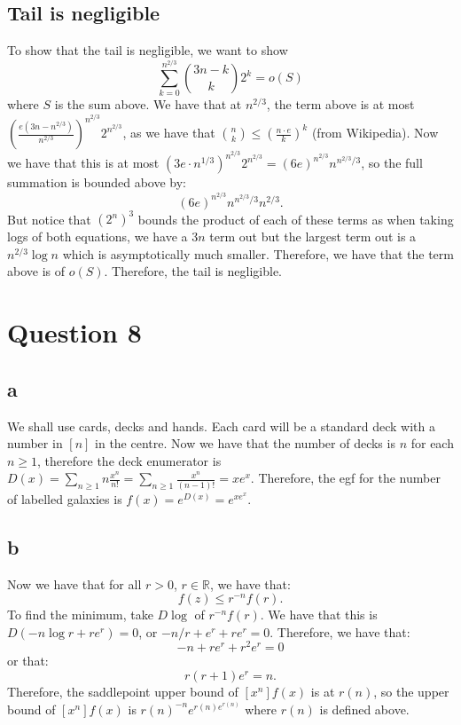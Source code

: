 \documentclass[]{article}
\theoremstyle{definition}
\numberwithin{theorem}{section}
\numberwithin{equation}{section}
\begin{document}
\subsection{Tail is negligible}
To show that the tail is negligible, we want to show
\begin{equation}
	\sum_{k = 0}^{n^{2/3}}\binom{3n - k}{k} 2^k = o(S)
\end{equation}
where $S$ is the sum above. 
We have that at $n^{2/3}$, the term above is at most $\left(\frac{e(3n - n^{2/3})}{n^{2/3}}\right)^{n^{2/3}} 2^{n^{2/3}}$, as we have that $\binom{n}{k} \leq \left(\frac{n \cdot e}{k}\right)^k$ (from Wikipedia). Now we have that this is at most $(3e \cdot n^{1/3})^{n^{2/3}} 2^{n^{2/3}} = (6e)^{n^{2/3}} n^{n^{2/3}/3}$, so the full summation is bounded above by:
\begin{equation}
	(6e)^{n^{2/3}} n^{n^{2/3}/3} n^{2/3}.
\end{equation} 
But notice that $(2^n)^3$ bounds the product of each of these terms as when taking logs of both equations, we have a $3n$ term out but the largest term out is a $ n^{2/3} \log n$ which is asymptotically much smaller. Therefore, we have that the term above is of $o(S)$. Therefore, the tail is negligible. 
\section{Question 8}
\subsection{a}
We shall use cards, decks and hands. Each card will be a standard deck with a number in $[n]$ in the centre. Now we have that the number of decks is $n$ for each $n \geq 1$, therefore the deck enumerator is $D(x) = \sum_{n \geq 1} n \frac{x^n}{n!} = \sum_{n \geq 1} \frac{x^n}{(n - 1)!} = x e^x$. 
Therefore, the egf for the number of labelled galaxies is $f(x) = e^{D(x)} = e^{x e^x}$. 

\subsection{b}
Now we have that for all $r > 0$, $r \in \mathbb{R}$, we have that:
\begin{equation}
	[z^n] f(z) \leq r^{-n} f(r).
\end{equation}
To find the minimum, take $D \log$ of $r^{-n} f(r)$. We have that this is $D(-n \log r + r e^r) = 0$, or $-n/r + e^r + r e^r = 0$. Therefore, we have that:
\begin{equation}
	-n + r e^r + r^2 e^r = 0
\end{equation}
or that:
\begin{equation}
	r (r + 1) e^r = n.
\end{equation}
Therefore, the saddlepoint upper bound of $[x^n] f(x)$ is at $r(n)$, so the upper bound of $[x^n] f(x)$ is $r(n)^{-n} e^{r(n) e^{r(n)}}$ where $r(n)$ is defined above. 
\end{document}
